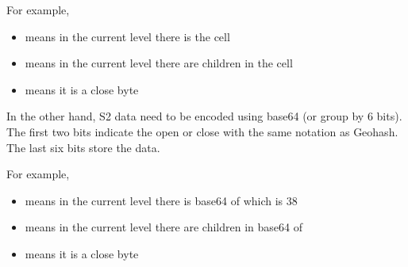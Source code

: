 \npara For example,
\begin{itemize}
  \item {} means in the current level there is the cell 
  \item {} means in the current level there are children in the cell 
  \item {} means it is a close byte
\end{itemize}

\npara In the other hand, S2 data need to be encoded using base64 (or group by 6 bits).
The first two bits indicate the open or close with the same notation as Geohash.
The last six bits store the data.

\npara For example,
\begin{itemize}
  \item {} means in the current level there is base64 of  which is 38
  \item {} means in the current level there are children in base64 of 
  \item {} means it is a close byte
\end{itemize}
